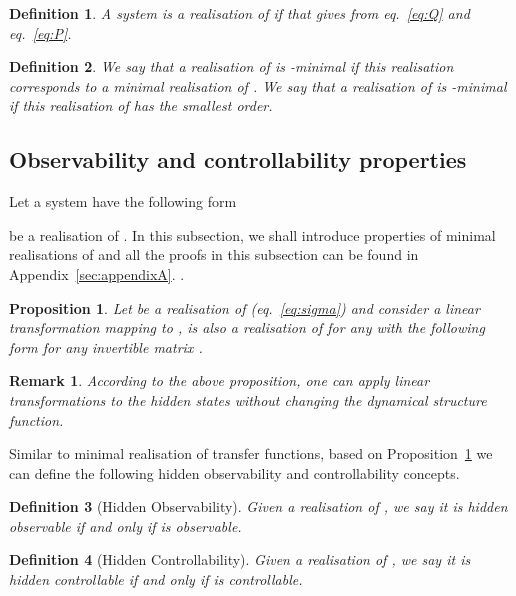 \documentclass[twocolumn,12pt]{autart}
\theoremstyle{plain}
\newtheorem{proposition}{Proposition}
\newtheorem{definition}{Definition}
\newtheorem{remark}{Remark}
\begin{document}
\begin{definition}A system  is a realisation of  if that  gives  from eq.~\eqref{eq:Q} and eq.~\eqref{eq:P}.
\end{definition}






\begin{definition}
We say that a realisation  of  is -minimal if this realisation corresponds to a minimal realisation of . We say that a realisation  of  is -minimal if this realisation of  has the smallest order. 
\end{definition}



\subsection{Observability and controllability properties}
Let a system  have the following form

be a realisation of . In this subsection, we shall introduce properties of minimal realisations of  and all the proofs in this subsection can be found in Appendix~\ref{sec:appendixA}.
.




\begin{proposition}\label{lemma:tra}
Let  be a realisation of  (eq.~\eqref{eq:sigma}) and consider a linear transformation mapping  to ,   is also a realisation of  for any  with the following form 
for any invertible matrix .
\end{proposition} 

\begin{remark}
According to the above proposition, one can apply linear transformations to the hidden states without changing the dynamical structure function. \end{remark}
Similar to minimal realisation of transfer functions, based on Proposition~\ref{lemma:tra} we can define the following hidden observability and controllability concepts. 

\begin{definition}[Hidden Observability]
Given a realisation   of , we say it is hidden observable if and only if  is observable.
\end{definition}

\begin{definition}[Hidden Controllability]
Given a realisation  of , we say it is hidden controllable if and only if  is controllable.  
\end{definition}
\end{document}
